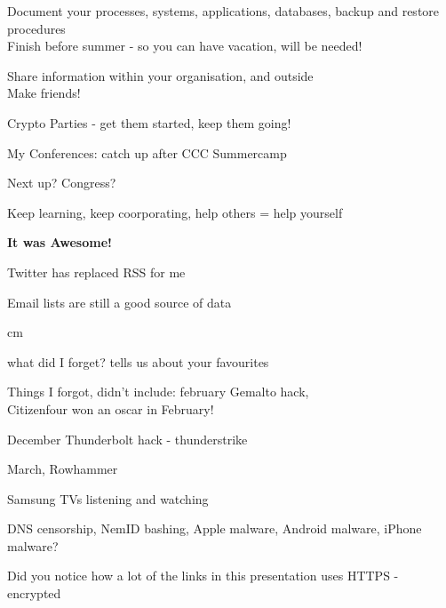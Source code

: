 \documentclass[20pt,landscape,a4paper,footrule]{foils}
\begin{document}


\begin{list2}
\item Document your processes, systems, applications, databases, backup and restore procedures\\
Finish before summer - so you can have vacation, will be needed!
\item Share information within your organisation, and outside\\
Make friends!
\item Crypto Parties - get them started, keep them going!
\item My Conferences: catch up after CCC Summercamp
\item Next up? Congress? 
\end{list2}

\vskip 2cm
\centerline{Keep learning, keep coorporating, help others = help yourself}


\centerline{\bf It was Awesome!}



\begin{list1}
\item Twitter has replaced RSS for me
\item Email lists are still a good source of data
\end{list1}




 cm

\centerline{\Large what did I forget? tells us about your favourites \smiley}

Things I forgot, didn't include: february Gemalto hack,\\
Citizenfour won an oscar in February!

December Thunderbolt hack - thunderstrike

March, Rowhammer\\
{\small{}}

Samsung TVs listening and watching

DNS censorship, NemID bashing, Apple malware, Android malware, iPhone malware?

Did you notice how a lot of the links in this presentation uses HTTPS - encrypted

\myquestionspage
\end{document}
